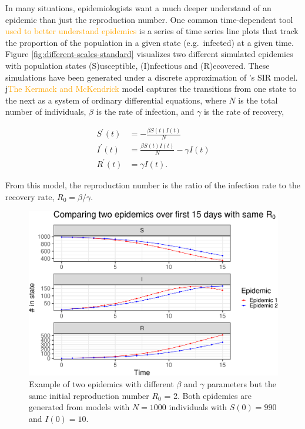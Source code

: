 \documentclass[
  shortnames]{jss}
\begin{document}
In many situations, epidemiologists want a much deeper understand of an
epidemic than just the reproduction number. One common time-dependent
tool \textcolor{orange}{used to better understand epidemics} is a series
of time series line plots that track the proportion of the population in
a given state (e.g.~infected) at a given time. Figure
\ref{fig:different-scales-standard} visualizes two different simulated
epidemics with population states (S)usceptible, (I)nfectious and
(R)ecovered. These simulations have been generated under a discrete
approximation of \citet{Kermack1927}'s SIR model.
j\textcolor{orange}{The Kermack and McKendrick} model captures the
transitions from one state to the next as a system of ordinary
differential equations, where \(N\) is the total number of individuals,
\(\beta\) is the rate of infection, and \(\gamma\) is the rate of
recovery,

\begin{align}\label{eq:sir-ode}
    S^\prime(t) &= -\frac{\beta S(t)I(t)}{N} \\
    I^\prime(t) &= \frac{\beta S(t)I(t)}{N} - \gamma I(t) \nonumber\\
    R^\prime(t) &= \gamma I(t) \nonumber.
\end{align}

From this model, the reproduction number is the ratio of the infection
rate to the recovery rate, \(R_0 = \beta/\gamma\).

\begin{CodeChunk}
\begin{figure}[H]

{\centering \includegraphics{Figs/unnamed-chunk-2-1} 

}

\caption{\label{fig:different-scales-standard}Example of two epidemics with different $\beta$ and $\gamma$ parameters but the same initial reproduction number $R_0$ = 2.  Both epidemics are generated from models with $N= 1000$ individuals with $S(0) = 990$ and $I(0) = 10$.}\label{fig:unnamed-chunk-2}
\end{figure}
\end{CodeChunk}
\end{document}
